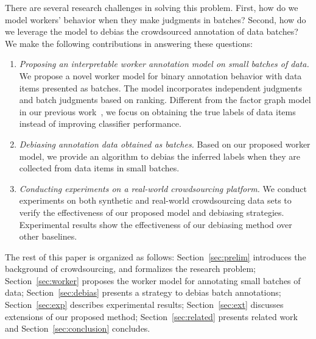 There are several research challenges in solving this problem.
First, how do we model workers' behavior when they make judgments in batches?
Second, how do we leverage the model to debias the crowdsourced annotation of data batches?
We make the following contributions in answering these questions:
\begin{enumerate}
  \item \emph{Proposing an interpretable worker annotation model on small batches of data.}
        We propose a novel worker model for binary annotation behavior with data items presented as batches.
        The model incorporates independent judgments and batch judgments based on ranking.
        Different from the factor graph model in our previous work~\cite{zhuang:wsdm2015},
        we focus on obtaining the true labels of data items instead of improving classifier performance.
  \item \emph{Debiasing annotation data obtained as batches.}
        Based on our proposed worker model, we provide an algorithm to debias the inferred labels
        when they are collected from data items in small batches.
  \item \emph{Conducting experiments on a real-world crowdsourcing platform.}
        We conduct experiments on both synthetic and real-world crowdsourcing data sets
        to verify the effectiveness of our proposed model and debiasing strategies.
        Experimental results show the effectiveness of our debiasing method over other baselines.
\end{enumerate}

The rest of this paper is organized as follows:
Section~\ref{sec:prelim} introduces the background of crowdsourcing, and formalizes the research problem;
Section~\ref{sec:worker} proposes the worker model for annotating small batches of data;
Section~\ref{sec:debias} presents a strategy to debias batch annotations;
Section~\ref{sec:exp} describes experimental results;
Section~\ref{sec:ext} discusses extensions of our proposed method;
Section~\ref{sec:related} presents related work and Section~\ref{sec:conclusion} concludes.







